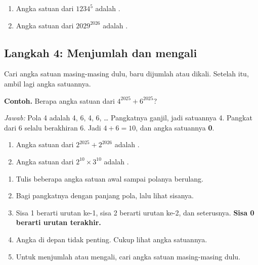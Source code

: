\documentclass[11pt,a4paper]{article}
\begin{document}
\begin{giliranmu}
\begin{enumerate}[label=\alph*.]
    \item Angka satuan dari $1234^{5}$ adalah \kosong.
    \item Angka satuan dari $2029^{2026}$ adalah \kosong.
\end{enumerate}
\end{giliranmu}

\subsection*{Langkah 4: Menjumlah dan mengali}
Cari angka satuan masing-masing dulu, baru dijumlah atau dikali. Setelah itu, ambil lagi
angka satuannya.

\begin{contoh}
\textbf{Contoh.} Berapa angka satuan dari $4^{2025} + 6^{2025}$?

\textit{Jawab:} Pola 4 adalah 4, 6, 4, 6, \dots{} Pangkatnya ganjil, jadi satuannya 4.
Pangkat dari 6 selalu berakhiran 6. Jadi $4 + 6 = 10$, dan angka satuannya \textbf{0}.
\end{contoh}

\begin{giliranmu}
\begin{enumerate}[label=\alph*.]
    \item Angka satuan dari $2^{2025} + 2^{2026}$ adalah \kosong.
    \item Angka satuan dari $2^{10} \times 3^{10}$ adalah \kosong.
\end{enumerate}
\end{giliranmu}

\begin{rangkuman}
\begin{enumerate}
    \item Tulis beberapa angka satuan awal sampai polanya berulang.
    \item Bagi pangkatnya dengan panjang pola, lalu lihat sisanya.
    \item Sisa 1 berarti urutan ke-1, sisa 2 berarti urutan ke-2, dan seterusnya.
          \textbf{Sisa 0 berarti urutan terakhir.}
    \item Angka di depan tidak penting. Cukup lihat angka satuannya.
    \item Untuk menjumlah atau mengali, cari angka satuan masing-masing dulu.
\end{enumerate}
\end{rangkuman}
\end{document}
